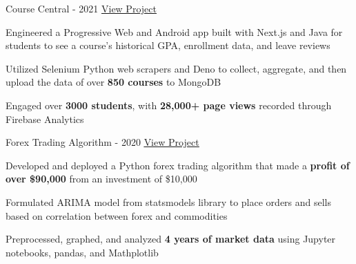 

\begin{cventries}

  \cventry
    {} %
    {Course Central - 2021} %
    {\href{https://coursecentral.ca/}{\underline{View Project}}} %
    {} %
    {
      \begin{cvitems} %
        \item {Engineered a Progressive Web and Android app built with Next.js and Java for students to see a course's historical GPA, enrollment data, and leave reviews}
        \item {Utilized Selenium Python web scrapers and Deno to collect, aggregate, and then upload the data of over \textbf{850 courses} to MongoDB}
        \item {Engaged over \textbf{3000 students}, with \textbf{28,000+ page views} recorded through Firebase Analytics}
      \end{cvitems}
    }

  \cventry
    {} %
    {Forex Trading Algorithm - 2020} %
    {\href{https://github.com/KnlnKS/Forex-Price-Predictor-Quantconnect}{\underline{View Project}}} %
    {} %
    {
      \begin{cvitems} %
        \item {Developed and deployed a Python forex trading algorithm that made a \textbf{profit of over \$90,000} from an investment of \$10,000}
        \item {Formulated ARIMA model from statsmodels library to place orders and sells based on correlation between forex and commodities}
        \item {Preprocessed, graphed, and analyzed \textbf{4 years of market data} using Jupyter notebooks, pandas, and Mathplotlib}
      \end{cvitems}
    }


\end{cventries}
